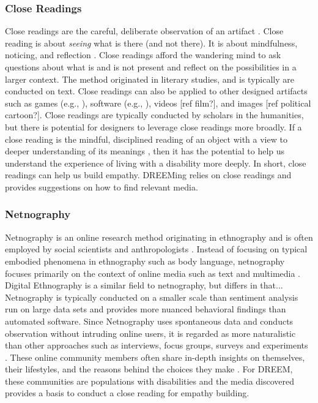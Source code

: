\subsubsection{Close Readings\label{CloseReadings}}
Close readings are the careful, deliberate observation of an artifact \cite{brummettTechniquesCloseReading2019}. Close reading is about \textit{seeing} what is there (and not there). It is about mindfulness, noticing, and reflection \cite{brummettTechniquesCloseReading2019}. Close readings afford the wandering mind to ask questions about what is and is not present and reflect on the possibilities in a larger context. The method originated in literary studies, and is typically are conducted on text. Close readings can also be applied to other designed artifacts such as games (e.g., \cite{wardrip-fruinHowPacManEats2020}), software (e.g., \cite{sackSoftwareArts2019}), videos {\color{red}[ref film?]}, and images {\color{red}[ref political cartoon?]}. Close readings are typically conducted by scholars in the humanities, but there is potential for designers to leverage close readings more broadly. If a close reading is the mindful, disciplined reading of an object with a view to deeper understanding of its meanings \cite{brummettTechniquesCloseReading2019}, then it has the potential to help us understand the experience of living with a disability more deeply. In short, close readings can help us build empathy. DREEMing relies on close readings and provides suggestions on how to find relevant media.

\subsubsection{Netnography}
Netnography is an online research method originating in ethnography and is often employed by social scientists and anthropologists \cite{kozinetsNetnographyEssentialGuide2019}. Instead of focusing on typical embodied phenomena in ethnography such as body language, netnography focuses primarily on the context of online media such as text and multimedia \cite{bartlReviewAnalysisLiterature2016}. Digital Ethnography is a similar field to netnography, {\color{red}but differs in that...} Netnography is typically conducted on a smaller scale than sentiment analysis run on large data sets and provides more nuanced behavioral findings than automated software. Since Netnography uses spontaneous data and conducts observation without intruding online users, it is regarded as more naturalistic than other approaches such as interviews, focus groups, surveys and experiments \cite{kozinetsNetnographyRedefined2015}. These online community members often share in-depth insights on themselves, their lifestyles, and the reasons behind the choices they make \cite{kozinetsNetnographyEssentialGuide2019}.  For DREEM, these communities are populations with disabilities and the media discovered provides a basis to conduct a close reading for empathy building.

